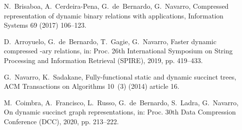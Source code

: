 \documentclass{elsarticle}
\begin{document}
\begin{thebibliography}{10}
N.~Brisaboa, A.~Cerdeira-Pena, G.~de~Bernardo, G.~Navarro, Compressed
  representation of dynamic binary relations with applications, Information
  Systems 69 (2017) 106--123.

D.~Arroyuelo, G.~de~Bernardo, T.~Gagie, G.~Navarro, Faster dynamic compressed
  -ary relations, in: Proc. 26th International Symposium on String
  Processing and Information Retrieval (SPIRE), 2019, pp. 419--433.

G.~Navarro, K.~Sadakane, Fully-functional static and dynamic succinct trees,
  ACM Transactions on Algorithms 10~(3) (2014) article 16.

M.~Coimbra, A.~Francisco, L.~Russo, G.~de~Bernardo, S.~Ladra, G.~Navarro, On
  dynamic succinct graph representations, in: Proc. 30th Data Compression
  Conference (DCC), 2020, pp. 213--222.

\end{thebibliography}
\end{document}

